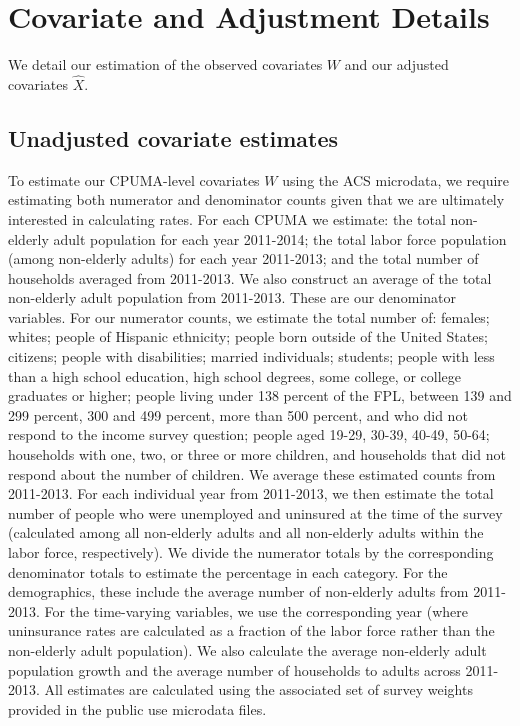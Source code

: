 \section{Covariate and Adjustment Details}\label{app:adjustmentdetails}

We detail our estimation of the observed covariates $W$ and our adjusted covariates $\hat{X}$. 

\subsection{Unadjusted covariate estimates}

To estimate our CPUMA-level covariates $W$ using the ACS microdata, we require estimating both numerator and denominator counts given that we are ultimately interested in calculating rates. For each CPUMA we estimate: the total non-elderly adult population for each year 2011-2014; the total labor force population (among non-elderly adults) for each year 2011-2013; and the total number of households averaged from 2011-2013. We also construct an average of the total non-elderly adult population from 2011-2013. These are our denominator variables. For our numerator counts, we estimate the total number of: females; whites; people of Hispanic ethnicity; people born outside of the United States; citizens; people with disabilities; married individuals; students; people with less than a high school education, high school degrees, some college, or college graduates or higher; people living under 138 percent of the FPL, between 139 and 299 percent, 300 and 499 percent, more than 500 percent, and who did not respond to the income survey question; people aged 19-29, 30-39, 40-49, 50-64; households with one, two, or three or more children, and households that did not respond about the number of children. We average these estimated counts from 2011-2013. For each individual year from 2011-2013, we then estimate the total number of people who were unemployed and uninsured at the time of the survey (calculated among all non-elderly adults and all non-elderly adults within the labor force, respectively). We divide the numerator totals by the corresponding denominator totals to estimate the percentage in each category. For the demographics, these include the average number of non-elderly adults from 2011-2013. For the time-varying variables, we use the corresponding year (where uninsurance rates are calculated as a fraction of the labor force rather than the non-elderly adult population). We also calculate the average non-elderly adult population growth and the average number of households to adults across 2011-2013. All estimates are calculated using the associated set of survey weights provided in the public use microdata files.

